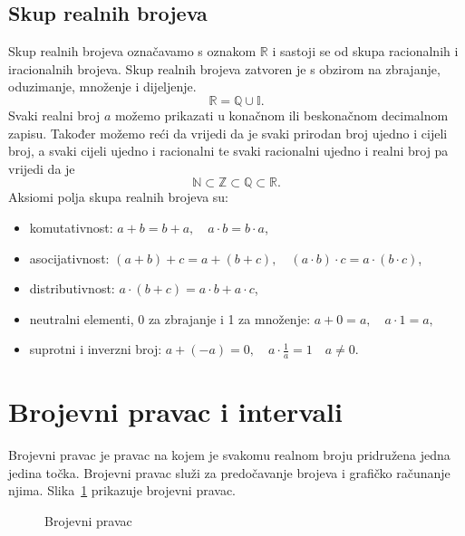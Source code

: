 \subsection{Skup realnih brojeva}\label{subsec:skup-realnih-brojeva}
Skup realnih brojeva označavamo s oznakom $\mathbb{R}$ i sastoji se od skupa racionalnih i iracionalnih brojeva.
Skup realnih brojeva zatvoren je s obzirom na zbrajanje, oduzimanje, množenje i dijeljenje.
\[ \mathbb{R}=\mathbb{Q} \cup \mathbb{I}. \]
Svaki realni broj $a$ možemo prikazati u konačnom ili beskonačnom decimalnom zapisu.
Također možemo reći da vrijedi da je svaki prirodan broj ujedno i cijeli broj, a svaki cijeli ujedno i racionalni te svaki racionalni ujedno i realni broj pa vrijedi da je
\[ \mathbb{N} \subset \mathbb{Z} \subset \mathbb{Q} \subset \mathbb{R}. \]
Aksiomi polja skupa realnih brojeva su:
\begin{itemize}
  \item komutativnost: $a+b=b+a, \quad a \cdot b = b \cdot a$,
  \item asocijativnost: $(a+b)+c=a+(b+c), \quad (a \cdot b) \cdot c = a \cdot (b \cdot c)$,
  \item distributivnost: $a \cdot (b + c) = a \cdot b + a \cdot c$,
  \item neutralni elementi, 0 za zbrajanje i 1 za množenje: $a + 0 = a, \quad a \cdot 1 = a,$
  \item suprotni i inverzni broj: $\displaystyle a + (-a) = 0, \quad a \cdot \frac{1}{a} = 1 \quad a \neq 0.$
\end{itemize}



\section{Brojevni pravac i intervali}\label{sec:brojevni-pravac-i-intervali}
Brojevni pravac je pravac na kojem je svakomu realnom broju pridružena jedna jedina točka.
Brojevni pravac služi za predočavanje brojeva i grafičko računanje njima.
Slika~\ref{fig:brojevni-pravac} prikazuje brojevni pravac.

\begin{figure}[ht]
\begin{center}\vspace{0.25cm}
\end{center}
\caption{Brojevni pravac}\label{fig:brojevni-pravac}
\end{figure}

